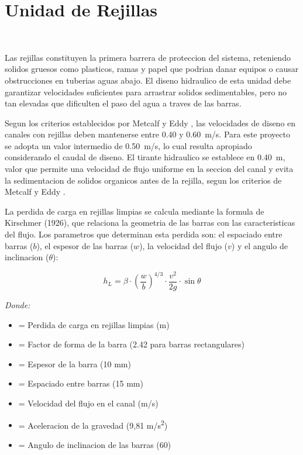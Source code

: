 \documentclass[12pt,a4paper]{article}
\newcommand{\captionequation}[1]{}  %
\begin{document}
\section{Unidad de Rejillas}

\

Las rejillas constituyen la primera barrera de proteccion del sistema, reteniendo solidos gruesos como plasticos, ramas y papel que podrian danar equipos o causar obstrucciones en tuberias aguas abajo. El diseno hidraulico de esta unidad debe garantizar velocidades suficientes para arrastrar solidos sedimentables, pero no tan elevadas que dificulten el paso del agua a traves de las barras.

Segun los criterios establecidos por Metcalf y Eddy \cite{metcalf2014}, las velocidades de diseno en canales con rejillas deben mantenerse entre 0.40 y 0.60~m/s. Para este proyecto se adopta un valor intermedio de 0.50~m/s, lo cual resulta apropiado considerando el caudal de diseno. El tirante hidraulico se establece en 0.40~m, valor que permite una velocidad de flujo uniforme en la seccion del canal y evita la sedimentacion de solidos organicos antes de la rejilla, segun los criterios de Metcalf y Eddy \cite{metcalf2014}.

La perdida de carga en rejillas limpias se calcula mediante la formula de Kirschmer (1926), que relaciona la geometria de las barras con las caracteristicas del flujo. Los parametros que determinan esta perdida son: el espaciado entre barras ($b$), el espesor de las barras ($w$), la velocidad del flujo ($v$) y el angulo de inclinacion ($\theta$):

\begin{equation}
h_L = \beta \cdot \left(\frac{w}{b}\right)^{4/3} \cdot \frac{v^2}{2g} \cdot \sin\theta
\end{equation}
\captionequation{Perdida de carga en rejillas limpias - Formula de Kirschmer}

\textit{Donde:}
\begin{itemize}[noitemsep,leftmargin=2em]
    \item[$h_L$] = Perdida de carga en rejillas limpias (m)
    \item[$\beta$] = Factor de forma de la barra (2.42 para barras rectangulares)
    \item[$w$] = Espesor de la barra (10 mm)
    \item[$b$] = Espaciado entre barras (15 mm)
    \item[$v$] = Velocidad del flujo en el canal (m/s)
    \item[$g$] = Aceleracion de la gravedad (9,81 m/s\textsuperscript{2})
    \item[$\theta$] = Angulo de inclinacion de las barras (60\textdegree)
\end{itemize}
\end{document}
